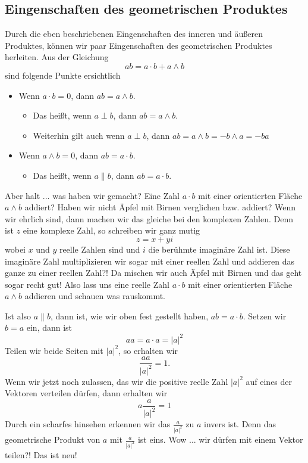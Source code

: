 \documentclass[fleqn]{scrartcl}
\numberwithin{equation}{section}
\begin{document}
\subsection{Eingenschaften des geometrischen Produktes}
Durch die eben beschriebenen Eingenschaften des inneren und äußeren Produktes,
können wir paar Eingenschaften des geometrischen Produktes herleiten. Aus der
Gleichung
\[ab = a\cdot b + a\wedge b\]
sind folgende Punkte ersichtlich
\begin{itemize}
\item Wenn $a \cdot b = 0$, dann $ab = a \wedge b$.
  \begin{itemize}
  \item Das heißt, wenn $a \perp b$, dann $ab = a\wedge b$.
  \item Weiterhin gilt auch wenn $a \perp b$, dann $ab = a \wedge b = - b
      \wedge a = -ba$
  \end{itemize}
\item Wenn $a\wedge b = 0$, dann $ab = a \cdot b$.
  \begin{itemize}
  \item Das heißt, wenn $a \parallel b$, dann $ab = a \cdot b$.
  \end{itemize}
\end{itemize}

Aber halt ... was haben wir gemacht? Eine Zahl $a\cdot b$ mit einer orientierten
Fläche $a\wedge b$ addiert? Haben wir nicht Äpfel mit Birnen verglichen bzw.
addiert? Wenn wir ehrlich sind, dann machen wir das gleiche bei den komplexen
Zahlen. Denn ist $z$ eine komplexe Zahl, so schreiben wir ganz mutig
\[z=x+yi\]
wobei $x$ und $y$ reelle Zahlen sind und $i$ die berühmte imaginäre Zahl ist.
Diese imaginäre Zahl multiplizieren wir sogar mit einer reellen Zahl und
addieren das ganze zu einer reellen Zahl?! Da mischen wir auch Äpfel mit
Birnen und das geht sogar recht gut! Also lass uns eine reelle Zahl $a\cdot b$
mit einer orientierten Fläche $a\wedge b$ addieren und schauen was rauskommt.

Ist also $a \parallel b$, dann ist, wie wir oben fest gestellt haben, $ab = a
\cdot b$. Setzen wir $b=a$ ein, dann ist
\[aa=a\cdot a = |a|^2\]
Teilen wir beide Seiten mit $|a|^2$, so erhalten wir
\[\frac{aa}{|a|^2}=1.\]
Wenn wir jetzt noch zulassen, das wir die positive reelle Zahl $|a|^2$ auf
eines der Vektoren verteilen dürfen, dann erhalten wir
\[a\frac{a}{|a|^2}=1\]
Durch ein scharfes hinsehen erkennen wir das $\frac{a}{|a|^2}$ zu $a$ invers
ist. Denn das geometrische Produkt von $a$ mit $\frac{a}{|a|^2}$ ist eins. Wow
... wir dürfen mit einem Vektor teilen?! Das ist neu!
\end{document}
